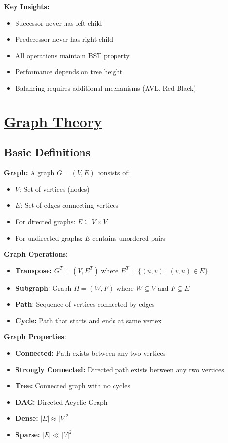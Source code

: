 \textbf{Key Insights:}
\begin{itemize}[noitemsep,leftmargin=*]
    \item Successor never has left child
    \item Predecessor never has right child
    \item All operations maintain BST property
    \item Performance depends on tree height
    \item Balancing requires additional mechanisms (AVL, Red-Black)
\end{itemize}


\section{\texorpdfstring{\underline{Graph Theory}}{Graph Theory}}
\subsection{Basic Definitions}
\textbf{Graph:} A graph $G = (V,E)$ consists of:
\begin{itemize}[noitemsep]
    \item $V$: Set of vertices (nodes)
    \item $E$: Set of edges connecting vertices
    \item For directed graphs: $E \subseteq V \times V$
    \item For undirected graphs: $E$ contains unordered pairs
\end{itemize}

\textbf{Graph Operations:}
\begin{itemize}[noitemsep]
    \item \textbf{Transpose:} $G^T = (V,E^T)$ where $E^T = \{(u,v) \mid (v,u) \in E\}$
    \item \textbf{Subgraph:} Graph $H = (W,F)$ where $W \subseteq V$ and $F \subseteq E$
    \item \textbf{Path:} Sequence of vertices connected by edges
    \item \textbf{Cycle:} Path that starts and ends at same vertex
\end{itemize}

\textbf{Graph Properties:}
\begin{itemize}[noitemsep]
    \item \textbf{Connected:} Path exists between any two vertices
    \item \textbf{Strongly Connected:} Directed path exists between any two vertices
    \item \textbf{Tree:} Connected graph with no cycles
    \item \textbf{DAG:} Directed Acyclic Graph
    \item \textbf{Dense:} $|E| \approx |V|^2$
    \item \textbf{Sparse:} $|E| \ll |V|^2$
\end{itemize}

